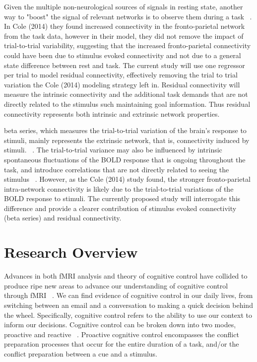 \documentclass[phd,appendix,figures]{uithesis}
\begin{document}
Given the multiple non-neurological sources of signals in resting state, another way to "boost" the signal of relevant networks is to observe them during a task ~\citep{Cole2014}.
In Cole (2014) they found increased connectivity in the fronto-parietal network from the task data, however in their model, they did not remove the impact of trial-to-trial variability, suggesting that the increased fronto-parietal connectivity could have been due to stimulus evoked connectivity and not due to a general state difference between rest and task.
The current study will use one regressor per trial to model residual connectivity, effectively removing the trial to trial variation the Cole (2014) modeling strategy left in.
Residual connectivity will measure the intrinsic connectivity and the additional task demands that are not directly related to the stimulus such maintaining goal information.
Thus residual connectivity represents both intrinsic and extrinsic network properties.

beta series, which measures the trial-to-trial variation of the brain's response to stimuli, mainly represents the extrinsic network, that is, connectivity induced by stimuli. ~\citep{Rissman2004}.
The trial-to-trial variance may also be influenced by intrinsic spontaneous fluctuations of the BOLD response that is ongoing throughout the task, and introduce correlations that are not directly related to seeing the stimulus ~\citep{He2013}.
However, as the Cole (2014) study found, the stronger fronto-parietal intra-network connectivity is likely due to the trial-to-trial variations of the BOLD response to stimuli.
The currently proposed study will interrogate this difference and provide a clearer contribution of stimulus evoked connectivity (beta series) and residual connectivity.


\chapter{Research Overview}

Advances in both fMRI analysis and theory of cognitive control have collided to produce ripe new areas to advance our understanding of cognitive control through fMRI ~\citep{Braver2012,Rissman2004,Mumford2012,Cisler2012}.
We can find evidence of cognitive control in our daily lives, from switching between an email and a conversation to making a quick decision behind the wheel. 
Specifically, cognitive control refers to the ability to use our context to inform our decisions. Cognitive control can be broken down into two modes, proactive and reactive ~\citep{Braver2012}. 
Proactive cognitive control encompasses the conflict preparation processes that occur for the entire duration of a task, and/or the conflict preparation between a cue and a stimulus.
\end{document}
